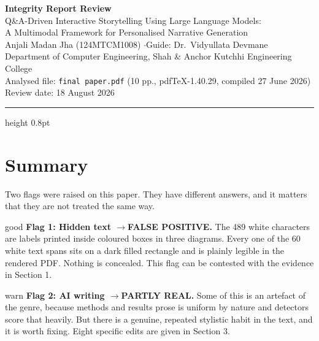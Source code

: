 \documentclass[11pt,a4paper]{article}
\begin{document}
\begin{center}
{\Large\bfseries Integrity Report Review}\\[4pt]
{\normalsize Q\&A-Driven Interactive Storytelling Using Large Language Models:\\
A Multimodal Framework for Personalised Narrative Generation}\\[6pt]
{\small Anjali Madan Jha (124MTCM1008) \quad$\cdot$\quad Guide: Dr.\ Vidyullata Devmane\\
Department of Computer Engineering, Shah \& Anchor Kutchhi Engineering College}\\[6pt]
{\footnotesize Analysed file: \texttt{final paper.pdf} (10 pp., pdfTeX-1.40.29, compiled 27 June 2026)\\
Review date: 18 August 2026}
\end{center}

\vspace{4pt}
\hrule height 0.8pt
\vspace{10pt}

\section*{Summary}

Two flags were raised on this paper. They have different answers, and it matters
that they are not treated the same way.

\begin{verdict}{good}
\textbf{Flag 1: Hidden text \quad$\rightarrow$\quad FALSE POSITIVE.}
The 489 white characters are labels printed inside coloured boxes in three
diagrams. Every one of the 60 white text spans sits on a dark filled rectangle
and is plainly legible in the rendered PDF. Nothing is concealed. This flag can
be contested with the evidence in Section 1.
\end{verdict}

\vspace{6pt}

\begin{verdict}{warn}
\textbf{Flag 2: AI writing \quad$\rightarrow$\quad PARTLY REAL.}
Some of this is an artefact of the genre, because methods and results prose is
uniform by nature and detectors score that heavily. But there is a genuine,
repeated stylistic habit in the text, and it is worth fixing. Eight specific
edits are given in Section 3.
\end{verdict}

\vspace{6pt}
\end{document}
